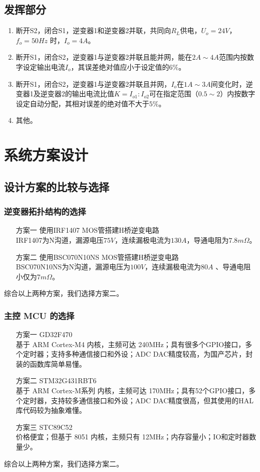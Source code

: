 \documentclass[a4paper,12pt]{article}
\begin{document}
\subsection{发挥部分}
\begin{enumerate}
    \item 断开S2，闭合S1，逆变器1和逆变器2并联，共同向$R_L$供电，$U_o=24V$， $f_o=50Hz$ 时，$I_o=4A$。
    \item 断开S1，闭合S2，逆变器1与逆变器2并联且能并网，能在$2A\sim4A$范围内按数字设定输出电流$I_o$，其误差绝对值应小于设定值的$6\%$。
    \item 断开S1，闭合S2，逆变器1与逆变器2并联且并网，$I_o$在$1A\sim 3A$间变化时，逆变器1及逆变器2的输出电流比值$K=I_{o1}:I_{o2}$可在指定范围（$0.5\sim 2$）内按数字设定自动分配，其相对误差的绝对值不大于$5\%$。
    \item 其他。
\end{enumerate}

\newpage

\section{系统方案设计}
\subsection{设计方案的比较与选择}

\subsubsection{逆变器拓扑结构的选择}
\begin{enumerate}
    \item[方案一] 使用IRF1407 MOS管搭建H桥逆变电路 \\ IRF1407为N沟道，漏源电压$75V$，连续漏极电流为$130A$，导通电阻为$7.8m\Omega$。
    \item[方案二] 使用BSC070N10NS MOS管搭建H桥逆变电路 \\ BSC070N10NS为N沟道，漏源电压为$100V$，连续漏极电流为$80A$ 、导通电阻小仅为$7m\Omega$。
\end{enumerate}
综合以上两种方案，我们选择方案二。

\subsubsection{主控 MCU 的选择}
\begin{enumerate}
    \item[方案一] GD32F470 \\ 基于 ARM Cortex-M4 内核，主频可达 240MHz；具有很多个GPIO接口，多个定时器；支持多种通信接口和外设；ADC DAC精度较高，为国产芯片，封装的函数库简单易懂。
    \item[方案二] STM32G431RBT6 \\ 基于 ARM Cortex-M系列 内核，主频可达 170MHz；具有52个GPIO接口，多个定时器，支持较多通信接口和外设；ADC DAC精度很高，但其使用的HAL库代码较为抽象难懂。    
    \item[方案三] STC89C52 \\ 价格便宜；但基于 8051 内核，主频只有 12MHz；内存容量小；IO和定时器数量少。
\end{enumerate}
综合以上两种方案，我们选择方案二。
\end{document}
